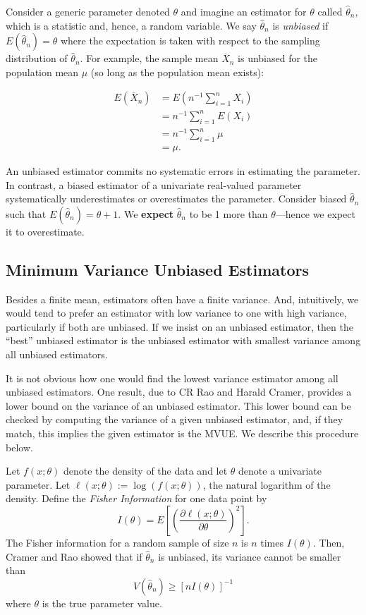 \documentclass[]{book}
\begin{document}
Consider a generic parameter denoted \(\theta\) and imagine an estimator
for \(\theta\) called \(\hat\theta_n\), which is a statistic and, hence,
a random variable. We say \(\hat\theta_n\) is \emph{unbiased} if
\(E(\hat\theta_n)=\theta\) where the expectation is taken with respect
to the sampling distribution of \(\hat\theta_n\). For example, the
sample mean \(\overline X_n\) is unbiased for the population mean
\(\mu\) (so long as the population mean exists):

\begin{align*}
E(\overline X_n) &= E\left(n^{-1}\sum_{i=1}^n X_i\right)\\
& = n^{-1}\sum_{i=1}^n E(X_i)\\
& = n^{-1}\sum_{i=1}^n \mu\\
& = \mu.
\end{align*}

An unbiased estimator commits no systematic errors in estimating the
parameter. In contrast, a biased estimator of a univariate real-valued
parameter systematically underestimates or overestimates the parameter.
Consider biased \(\hat\theta_n\) such that
\(E(\hat\theta_n) = \theta + 1\). We \textbf{expect} \(\hat\theta_n\) to
be 1 more than \(\theta\)---hence we expect it to overestimate.

\subsection{Minimum Variance Unbiased
Estimators}\label{minimum-variance-unbiased-estimators}

Besides a finite mean, estimators often have a finite variance. And,
intuitively, we would tend to prefer an estimator with low variance to
one with high variance, particularly if both are unbiased. If we insist
on an unbiased estimator, then the ``best'' unbiased estimator is the
unbiased estimator with smallest variance among all unbiased estimators.

It is not obvious how one would find the lowest variance estimator among
all unbiased estimators. One result, due to CR Rao and Harald Cramer,
provides a lower bound on the variance of an unbiased estimator. This
lower bound can be checked by computing the variance of a given unbiased
estimator, and, if they match, this implies the given estimator is the
MVUE. We describe this procedure below.

Let \(f(x;\theta)\) denote the density of the data and let \(\theta\)
denote a univariate parameter. Let
\(\ell(x;\theta) := \log(f(x;\theta))\), the natural logarithm of the
density. Define the \emph{Fisher Information} for one data point by
\[I(\theta) = E\left[\left(\frac{\partial \ell(x;\theta)}{\partial\theta}\right)^2\right].\]
The Fisher information for a random sample of size \(n\) is \(n\) times
\(I(\theta)\). Then, Cramer and Rao showed that if \(\hat\theta_n\) is
unbiased, its variance cannot be smaller than
\[V(\hat\theta_n)\geq \left[nI(\theta)\right]^{-1}\] where \(\theta\) is
the true parameter value.
\end{document}
